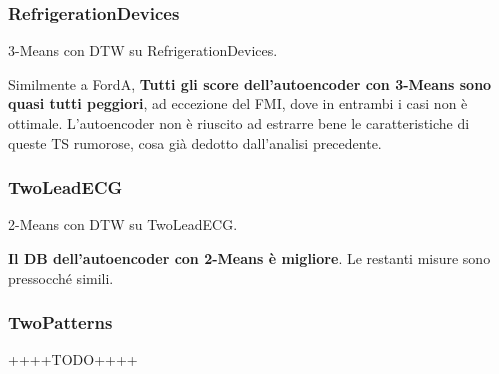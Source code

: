 \subsubsection{RefrigerationDevices}
\begin{center}
	\begin{table}[H]
		\centering
		\caption{3-Means con DTW su RefrigerationDevices.}
	\end{table}
\end{center}
Similmente a FordA, \textbf{Tutti gli score dell'autoencoder con 3-Means sono quasi tutti peggiori}, ad eccezione del FMI, dove in entrambi i casi non è ottimale. L'autoencoder non è riuscito ad estrarre bene le caratteristiche di queste TS rumorose, cosa già dedotto dall'analisi precedente. 

\subsubsection{TwoLeadECG}
\begin{center}
	\begin{table}[H]
		\centering
		\caption{2-Means con DTW su TwoLeadECG.}
	\end{table}
\end{center}
\textbf{Il DB dell'autoencoder con 2-Means è migliore}. Le restanti misure sono pressocché simili.

\subsubsection{TwoPatterns}
++++TODO++++

